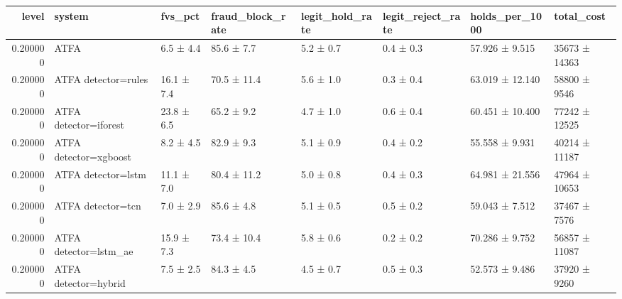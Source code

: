 \begin{tabular}{rlllllll}
\toprule
level & system & fvs\_pct & fraud\_block\_rate & legit\_hold\_rate & legit\_reject\_rate & holds\_per\_1000 & total\_cost \\
\midrule
0.200000 & ATFA & 6.5 ± 4.4 & 85.6 ± 7.7 & 5.2 ± 0.7 & 0.4 ± 0.3 & 57.926 ± 9.515 & 35673 ± 14363 \\
0.200000 & ATFA detector=rules & 16.1 ± 7.4 & 70.5 ± 11.4 & 5.6 ± 1.0 & 0.3 ± 0.4 & 63.019 ± 12.140 & 58800 ± 9546 \\
0.200000 & ATFA detector=iforest & 23.8 ± 6.5 & 65.2 ± 9.2 & 4.7 ± 1.0 & 0.6 ± 0.4 & 60.451 ± 10.400 & 77242 ± 12525 \\
0.200000 & ATFA detector=xgboost & 8.2 ± 4.5 & 82.9 ± 9.3 & 5.1 ± 0.9 & 0.4 ± 0.2 & 55.558 ± 9.931 & 40214 ± 11187 \\
0.200000 & ATFA detector=lstm & 11.1 ± 7.0 & 80.4 ± 11.2 & 5.0 ± 0.8 & 0.4 ± 0.3 & 64.981 ± 21.556 & 47964 ± 10653 \\
0.200000 & ATFA detector=tcn & 7.0 ± 2.9 & 85.6 ± 4.8 & 5.1 ± 0.5 & 0.5 ± 0.2 & 59.043 ± 7.512 & 37467 ± 7576 \\
0.200000 & ATFA detector=lstm\_ae & 15.9 ± 7.3 & 73.4 ± 10.4 & 5.8 ± 0.6 & 0.2 ± 0.2 & 70.286 ± 9.752 & 56857 ± 11087 \\
0.200000 & ATFA detector=hybrid & 7.5 ± 2.5 & 84.3 ± 4.5 & 4.5 ± 0.7 & 0.5 ± 0.3 & 52.573 ± 9.486 & 37920 ± 9260 \\
\bottomrule
\end{tabular}
